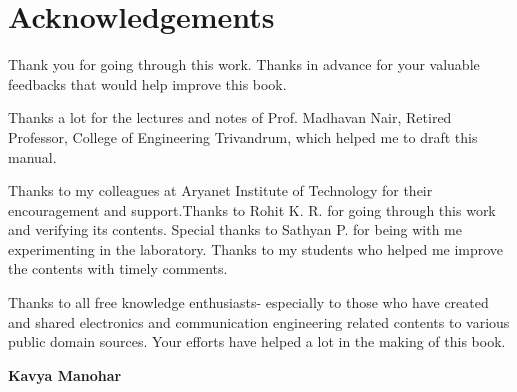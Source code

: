 \chapter*{Acknowledgements}

Thank you for going through this work. Thanks in advance for your valuable feedbacks that would help improve this book.

Thanks a lot for the lectures and notes of Prof. Madhavan Nair, Retired Professor, College of Engineering Trivandrum, which helped me to draft this manual.

Thanks to my colleagues at Aryanet Institute of Technology for their encouragement and support.Thanks to Rohit K. R. for going through this work and verifying its contents. Special thanks to Sathyan P. for being with me experimenting in the laboratory. Thanks to my students who helped me improve the contents with timely comments.

Thanks to all free knowledge enthusiasts- especially to those who have created and shared electronics and communication engineering related contents to various public domain sources. Your efforts have helped a lot in the making of this book.


\begin{flushright}
\textbf{Kavya Manohar}
\end{flushright}

